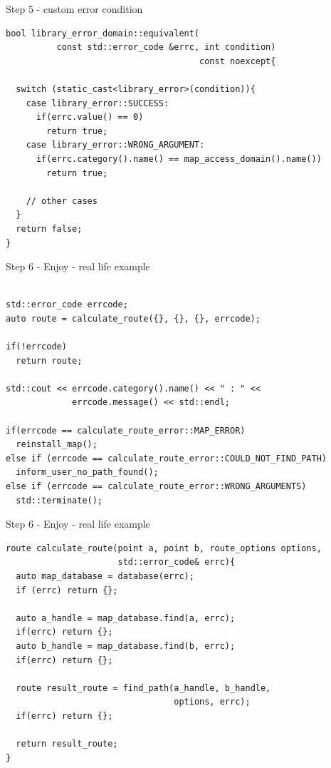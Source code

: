 \documentclass[10pt]{beamer}
\begin{document}
\begin{frame}[fragile]{Step 5 - custom error condition}
	\begin{verbatim}
bool library_error_domain::equivalent(
          const std::error_code &errc, int condition) 
                                      const noexcept{
                                      
  switch (static_cast<library_error>(condition)){
    case library_error::SUCCESS:
      if(errc.value() == 0)
        return true;
    case library_error::WRONG_ARGUMENT:
      if(errc.category().name() == map_access_domain().name())
        return true;
        
    // other cases
  }
  return false;
}
	\end{verbatim}
\end{frame}

\begin{frame}[fragile]{Step 6 - Enjoy - real life example}
	\begin{verbatim}

std::error_code errcode;
auto route = calculate_route({}, {}, {}, errcode);

if(!errcode)
  return route;

std::cout << errcode.category().name() << " : " <<
             errcode.message() << std::endl;

if(errcode == calculate_route_error::MAP_ERROR)
  reinstall_map();
else if (errcode == calculate_route_error::COULD_NOT_FIND_PATH)
  inform_user_no_path_found();
else if (errcode == calculate_route_error::WRONG_ARGUMENTS)
  std::terminate();
	\end{verbatim}
\end{frame}

\begin{frame}[fragile]{Step 6 - Enjoy - real life example}
	\begin{verbatim}
route calculate_route(point a, point b, route_options options,
                      std::error_code& errc){
  auto map_database = database(errc);
  if (errc) return {};

  auto a_handle = map_database.find(a, errc);
  if(errc) return {};
  auto b_handle = map_database.find(b, errc);
  if(errc) return {};

  route result_route = find_path(a_handle, b_handle,
                                 options, errc);
  if(errc) return {};

  return result_route;
}
	\end{verbatim}
\end{frame}
\end{document}
